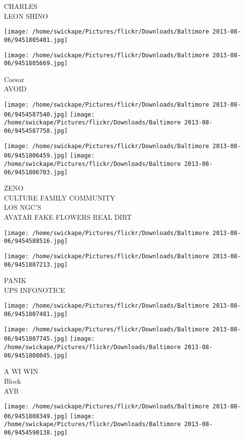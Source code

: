 \documentclass[10pt,letterpaper]{article}
\begin{document}
CHARLES\\
LEON SHINO
\pagebreak

\texttt{[image: /home/swickape/Pictures/flickr/Downloads/Baltimore 2013-08-06/9451805401.jpg]}

\vspace{0.25in}
\texttt{[image: /home/swickape/Pictures/flickr/Downloads/Baltimore 2013-08-06/9451805669.jpg]}

Caesar\\
AVOID
\pagebreak

\texttt{[image: /home/swickape/Pictures/flickr/Downloads/Baltimore 2013-08-06/9454587540.jpg]}
\texttt{[image: /home/swickape/Pictures/flickr/Downloads/Baltimore 2013-08-06/9454587758.jpg]}

\texttt{[image: /home/swickape/Pictures/flickr/Downloads/Baltimore 2013-08-06/9451806459.jpg]}
\texttt{[image: /home/swickape/Pictures/flickr/Downloads/Baltimore 2013-08-06/9451806703.jpg]}

ZENO\\
CULTURE FAMILY COMMUNITY\\
LOS NGC'S\\
AVATAR FAKE FLOWERS REAL DIRT
\pagebreak

\texttt{[image: /home/swickape/Pictures/flickr/Downloads/Baltimore 2013-08-06/9454588516.jpg]}

\vspace{0.25in}
\texttt{[image: /home/swickape/Pictures/flickr/Downloads/Baltimore 2013-08-06/9451807213.jpg]}

PANIK\\
UPS INFONOTICE
\pagebreak

\texttt{[image: /home/swickape/Pictures/flickr/Downloads/Baltimore 2013-08-06/9451807481.jpg]}

\vspace{0.25in}
\texttt{[image: /home/swickape/Pictures/flickr/Downloads/Baltimore 2013-08-06/9451807745.jpg]}
\texttt{[image: /home/swickape/Pictures/flickr/Downloads/Baltimore 2013-08-06/9451808045.jpg]}

A WI WIN\\
Block\\
AYB
\pagebreak

\texttt{[image: /home/swickape/Pictures/flickr/Downloads/Baltimore 2013-08-06/9451808349.jpg]}
\texttt{[image: /home/swickape/Pictures/flickr/Downloads/Baltimore 2013-08-06/9454590138.jpg]}
\end{document}
